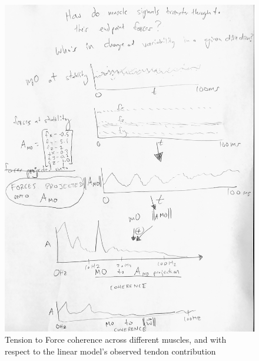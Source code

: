 \documentclass[utf8]{frontiersSCNS} %
\begin{document}
\begin{figure}[h!]
\begin{center}
\includegraphics[width=15cm]{figures/muscle_force_coherence/muscle_force_coherence.jpg}%
\end{center}
\caption{Tension to Force coherence across different muscles, and with respect to the linear model's observed tendon contribution}
\label{fig:muscle_force_coherence}
\end{figure}
\end{document}
